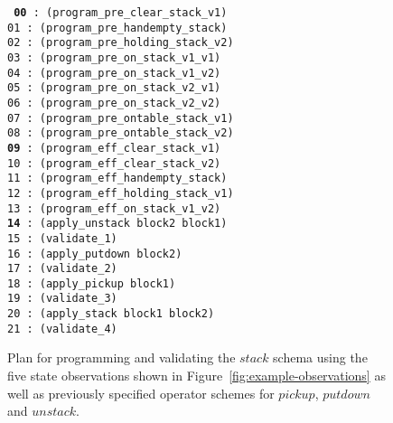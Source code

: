 \documentclass[3p,times]{elsarticle}
\begin{document}
\begin{figure}[hbt!]
{\footnotesize\tt
     {\bf 00} : (program\_pre\_clear\_stack\_v1)\\
     01 : (program\_pre\_handempty\_stack)\\
     02 : (program\_pre\_holding\_stack\_v2)\\
     03 : (program\_pre\_on\_stack\_v1\_v1)\\
     04 : (program\_pre\_on\_stack\_v1\_v2)\\
     05 : (program\_pre\_on\_stack\_v2\_v1)\\
     06 : (program\_pre\_on\_stack\_v2\_v2)\\
     07 : (program\_pre\_ontable\_stack\_v1)\\
     08 : (program\_pre\_ontable\_stack\_v2)\\
     {\bf 09} : (program\_eff\_clear\_stack\_v1)\\
    10 : (program\_eff\_clear\_stack\_v2)\\
    11 : (program\_eff\_handempty\_stack)\\
    12 : (program\_eff\_holding\_stack\_v1)\\
    13 : (program\_eff\_on\_stack\_v1\_v2)\\
    {\bf 14} : (apply\_unstack block2 block1)\\
    15 : (validate\_1)\\
    16 : (apply\_putdown block2)\\
    17 : (validate\_2)\\
    18 : (apply\_pickup block1)\\
    19 : (validate\_3)\\
    20 : (apply\_stack block1 block2)\\
    21 : (validate\_4)
}
 \caption{\small Plan for programming and validating the $stack$ schema using the five state observations shown in Figure~\ref{fig:example-observations} as well as previously specified operator schemes for $pickup$, $putdown$ and $unstack$.}
\label{fig:plan-observations}
\end{figure}
\end{document}
